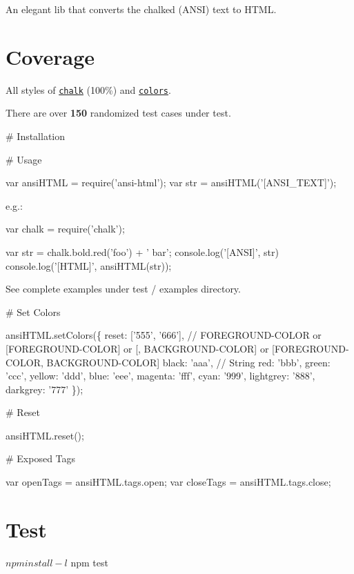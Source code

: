 An elegant lib that converts the chalked (A\+N\+SI) text to H\+T\+ML.

\section*{Coverage}


\begin{DoxyItemize}
\item All styles of \href{https://github.com/sindresorhus/chalk}{\tt chalk} (100\%) and \href{https://github.com/Marak/colors.js}{\tt colors}.
\item There are over {\bfseries 150} randomized test cases under {\ttfamily test}.
\end{DoxyItemize}

\# Installation 


\# Usage 
\begin{DoxyCode}
var ansiHTML = require('ansi-html');
var str = ansiHTML('[ANSI\_TEXT]');
\end{DoxyCode}


e.\+g.\+: 
\begin{DoxyCode}
var chalk = require('chalk');

var str = chalk.bold.red('foo') + ' bar';
console.log('[ANSI]', str)
console.log('[HTML]', ansiHTML(str));
\end{DoxyCode}


See complete examples under {\ttfamily test} / {\ttfamily examples} directory.

\# Set Colors 
\begin{DoxyCode}
ansiHTML.setColors(\{
  reset: ['555', '666'], // FOREGROUND-COLOR or [FOREGROUND-COLOR] or [, BACKGROUND-COLOR] or
       [FOREGROUND-COLOR, BACKGROUND-COLOR]
  black: 'aaa', // String
  red: 'bbb',
  green: 'ccc',
  yellow: 'ddd',
  blue: 'eee',
  magenta: 'fff',
  cyan: '999',
  lightgrey: '888',
  darkgrey: '777'
\});
\end{DoxyCode}


\# Reset 
\begin{DoxyCode}
ansiHTML.reset();
\end{DoxyCode}


\# Exposed Tags 
\begin{DoxyCode}
var openTags = ansiHTML.tags.open;
var closeTags = ansiHTML.tags.close;
\end{DoxyCode}


\section*{Test}


\begin{DoxyCode}
$ npm install -l
$ npm test
\end{DoxyCode}
 